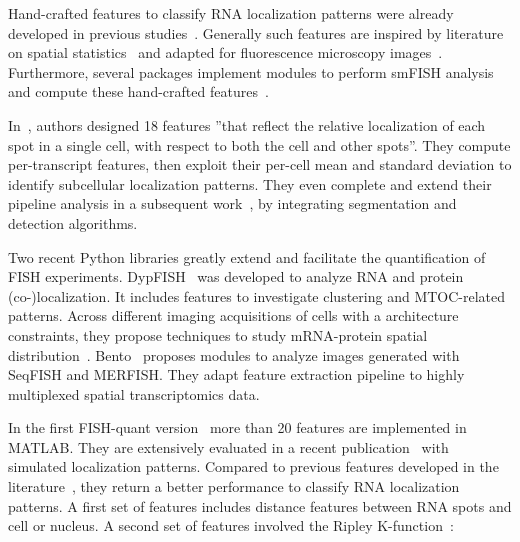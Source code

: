 Hand-crafted features to classify \ac{RNA} localization patterns were already developed in previous studies~\cite{battich_image-based_2013,samacoits_computational_2018}.
Generally such features are inspired by literature on spatial statistics~\cite{ripley2005spatial} and adapted for fluorescence microscopy images~\cite{lagache_statistical_2015,stueland_rdi_2019}.
Furthermore, several packages implement modules to perform \ac{smFISH} analysis and compute these hand-crafted features~\cite{mueller_fish-quant_2013,savulescu_dypfish_2019,mah_bento_2022}.

In~\cite{battich_image-based_2013}, authors designed 18 features ''that reflect the relative localization of each spot in a single cell, with respect to both the cell and other spots''.
They compute per-transcript features, then exploit their per-cell mean and standard deviation to identify subcellular localization patterns.
They even complete and extend their pipeline analysis in a subsequent work~\cite{stoeger_computer_2015}, by integrating segmentation and detection algorithms.

Two recent Python libraries greatly extend and facilitate the quantification of \ac{FISH} experiments.
DypFISH~\cite{savulescu_dypfish_2019} was developed to analyze \ac{RNA} and protein (co-)localization.
It includes features to investigate clustering and \ac{MTOC}-related patterns.
Across different imaging acquisitions of cells with a architecture constraints, they propose techniques to study \ac{mRNA}-protein spatial distribution~\cite{savulescu_interrogating_2021}.
Bento~\cite{mah_bento_2022} proposes modules to analyze images generated with \ac{SeqFISH} and \ac{MERFISH}.
They adapt feature extraction pipeline to highly multiplexed spatial transcriptomics data.

In the first FISH-quant version~\cite{mueller_fish-quant_2013} more than 20 features are implemented in MATLAB.
They are extensively evaluated in a recent publication~\cite{samacoits_computational_2018} with simulated localization patterns.
Compared to previous features developed in the literature~\cite{battich_image-based_2013}, they return a better performance to classify \ac{RNA} localization patterns.
A first set of features includes distance features between \ac{RNA} spots and cell or nucleus.
A second set of features involved the Ripley K-function~\cite{ripley2005spatial}:



~\cite{mcquin_cellprofiler_2018} %
~\cite{mueller_fish-quant_2013} %
~\cite{de_chaumont_icy_2012} %
~\cite{ershov_bringing_2021} %
~\cite{perkel_starfish_2019} %


